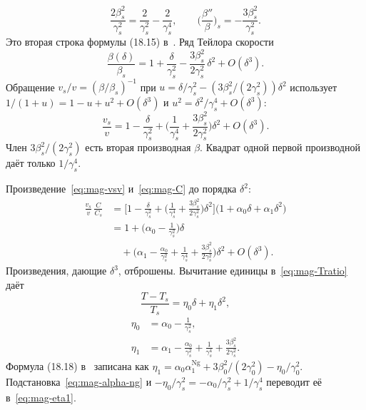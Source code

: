 \begin{equation}
\label{eq:mag-beta-second}
\frac{2\beta_s^2}{\gamma_s^2}=\frac{2}{\gamma_s^2}-\frac{2}{\gamma_s^4},
\qquad
\Biggl(\frac{\beta''}{\beta}\Biggr)_s
=-\frac{3\beta_s^2}{\gamma_s^2}.
\end{equation}
Это вторая строка формулы (18.15) в~\cite{Ng2006}. Ряд Тейлора скорости
\begin{equation}
\label{eq:mag-beta-series}
\frac{\beta(\delta)}{\beta_s}
=1+\frac{\delta}{\gamma_s^2}
-\frac{3\beta_s^2}{2\gamma_s^2}\,\delta^2+O(\delta^3).
\end{equation}
Обращение $v_s/v=(\beta/\beta_s)^{-1}$ при
$u=\delta/\gamma_s^2-(3\beta_s^2/(2\gamma_s^2))\delta^2$
использует $1/(1+u)=1-u+u^2+O(\delta^3)$ и $u^2=\delta^2/\gamma_s^4+O(\delta^3)$:
\begin{equation}
\label{eq:mag-vsv}
\frac{v_s}{v}
=1-\frac{\delta}{\gamma_s^2}
+\Biggl(\frac{1}{\gamma_s^4}+\frac{3\beta_s^2}{2\gamma_s^2}\Biggr)\delta^2
+O(\delta^3).
\end{equation}
Член $3\beta_s^2/(2\gamma_s^2)$ есть вторая производная $\beta$. Квадрат одной первой производной даёт только $1/\gamma_s^4$.

Произведение~\eqref{eq:mag-vsv} и~\eqref{eq:mag-C} до порядка $\delta^2$:
\begin{align}
\frac{v_s}{v}\,\frac{C}{C_s}
&=
\Biggl[1-\frac{\delta}{\gamma_s^2}
+\Biggl(\frac{1}{\gamma_s^4}+\frac{3\beta_s^2}{2\gamma_s^2}\Biggr)\delta^2\Biggr]
\bigl(1+\alpha_0\delta+\alpha_1\delta^2\bigr)
\nonumber\\
&=1+\Biggl(\alpha_0-\frac{1}{\gamma_s^2}\Biggr)\delta
\nonumber\\
&\quad+\Biggl(\alpha_1-\frac{\alpha_0}{\gamma_s^2}
+\frac{1}{\gamma_s^4}+\frac{3\beta_s^2}{2\gamma_s^2}\Biggr)\delta^2
+O(\delta^3).
\label{eq:mag-product}
\end{align}
Произведения, дающие $\delta^3$, отброшены. Вычитание единицы в~\eqref{eq:mag-Tratio} даёт
\begin{equation}
\label{eq:mag-eta-series}
\frac{T-T_s}{T_s}=\eta_0\delta+\eta_1\delta^2,
\end{equation}
\begin{align}
\eta_0&=\alpha_0-\frac{1}{\gamma_s^2},
\label{eq:mag-eta0}\\
\eta_1&=\alpha_1-\frac{\alpha_0}{\gamma_s^2}
+\frac{1}{\gamma_s^4}+\frac{3\beta_s^2}{2\gamma_s^2}.
\label{eq:mag-eta1}
\end{align}
Формула (18.18) в~\cite{Ng2006} записана как $\eta_1=\alpha_0\alpha_1^{\mathrm{Ng}}+3\beta_0^2/(2\gamma_0^2)-\eta_0/\gamma_0^2$. Подстановка~\eqref{eq:mag-alpha-ng} и $-\eta_0/\gamma_s^2=-\alpha_0/\gamma_s^2+1/\gamma_s^4$ переводит её в~\eqref{eq:mag-eta1}.


